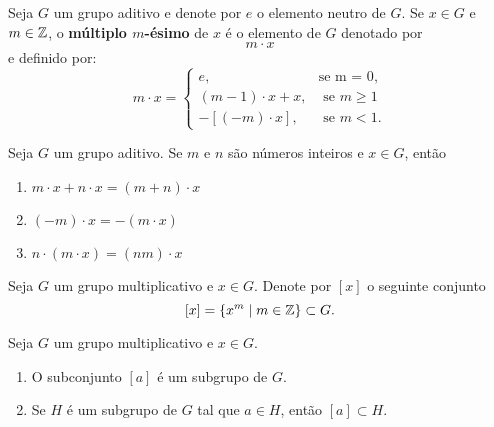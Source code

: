 \documentclass{beamer}
\begin{document}
    \begin{frame}
        Seja $G$ um grupo aditivo e denote por $e$ o elemento neutro de $G$. Se $x \in G$ e $m \in \mathbb{Z}$, o \textbf{múltiplo $m$-ésimo} de $x$ é o elemento de $G$ denotado por
        \[
            m \cdot x
        \]
        e definido por:
        \[
            m \cdot x = \begin{cases}
                    e, & \mbox{se m = 0},\\
                    (m - 1)\cdot x + x, & \mbox{ se } m \ge 1\\
                    -[(-m) \cdot x], & \mbox{ se } m < 1. 
                   \end{cases}
        \]
    \end{frame}

    \begin{frame}
        \begin{proposicao}
            Seja $G$ um grupo aditivo. Se $m$ e $n$ são números inteiros e $x \in G$, então
            \begin{enumerate}[label={\arabic*})]
                \item $m \cdot x + n \cdot x = (m + n) \cdot x$

                \item $(-m) \cdot x = -(m \cdot x)$

                \item $n\cdot (m \cdot x) = (nm)\cdot x$
            \end{enumerate}
        \end{proposicao}
    \end{frame}

    \begin{frame}
        Seja $G$ um grupo multiplicativo e $x \in G$. Denote por $[x]$ o seguinte conjunto
        \[
            [x] = \{x^m \mid m \in \mathbb{Z}\} \subset G.
        \]

        \begin{proposicao}
            Seja $G$ um grupo multiplicativo e $x \in G$.
            \begin{enumerate}[label={\arabic*})]
                \item O subconjunto $[a]$ é um subgrupo de $G$.

                \item Se $H$ é um subgrupo de $G$ tal que $a \in H$, então $[a] \subset H$.
            \end{enumerate}
        \end{proposicao}
    \end{frame}
\end{document}
